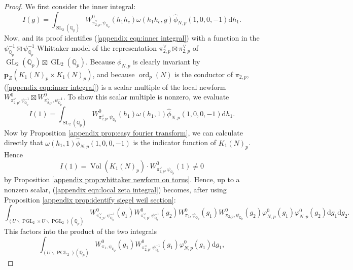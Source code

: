 \documentclass[12pt]{amsart}
\DeclareMathOperator{\ord}{ord}
\DeclareMathOperator{\SL}{SL}
\theoremstyle{definition}
\newcommand{\Q}{\mathbb{Q}}
\DeclareMathOperator{\GL}{GL}
\renewcommand{\d}{\mathrm{d}}
\begin{document}
\begin{proof}
We first consider the inner integral:
\begin{equation}\label{appendix eqn:inner integral}
   I(g) = \int_{\SL_2(\Q_p)} W_{\pi_{2,p}^\vee,\psi_{\Q_p}}^0(h_1h_c) \omega(h_1h_c,g) \widehat \phi_{N,p}(1,0,0,-1) \d h_1.
\end{equation}
Now, \cite[Lemma 6.3.3]{sweeting2022tateclassesendoscopyoperatornamegsp4} and its proof identifies (\ref{appendix eqn:inner integral}) with a function in the $\psi_{\Q_p}^{-1}\boxtimes \psi_{\Q_p}^{-1}$-Whittaker model of the representation $\pi_{2,p}^\vee\boxtimes \pi_{2,p}^\vee$ of $\GL_2(\Q_p)\boxtimes\GL_2(\Q_p)$. 
Because $\phi_{N,p}$ is clearly invariant by $\boldsymbol{p}_Z(K_1(N)_p\times K_1(N)_p)$, and because $\ord_p(N)$ is the conductor of $\pi_{2,p}$,  (\ref{appendix eqn:inner integral}) is a scalar multiple of the local newform $W_{\pi_{2,p}^\vee,\psi_{\Q_p}^{-1}}^0\boxtimes W_{\pi_{2,p}^\vee,\psi_{\Q_p}^{-1}}^0$.
To show this scalar multiple is nonzero, we evaluate 
\begin{equation}
    I(1) = \int_{\SL_2(\Q_p)} W_{\pi_{2,p}^\vee,\psi_{\Q_p}}^0(h_1) \omega(h_1, 1) \widehat \phi_{N,p} (1,0,0,-1) \d h_1.
\end{equation}
Now by Proposition \ref{appendix prop:easy fourier transform}, we can calculate directly that $\omega(h_1, 1) \widehat \phi_{N,p} (1,0,0,-1) $ is the indicator function of $K_1(N)_p$. Hence $$I(1) = \operatorname{Vol}(K_1(N)_p) \cdot W_{\pi_{2,p}^\vee,\psi_{\Q_p}}^0(1) \neq 0$$ by Proposition \ref{appendix prop:whittaker newform on torus}.
Hence, up to a nonzero scalar, (\ref{appendix eqn:local zeta integral}) becomes, after using Proposition \ref{appendix prop:identify siegel weil section}:
\begin{equation}
    \int_{(U\backslash \operatorname{PGL}_2\times U\backslash\operatorname{PGL}_2)(\Q_p)}W_{\pi_{2,p}^\vee, \psi_{\Q_p}^{-1}}^0(g_1) W_{\pi_{2,p}^\vee,\psi_{\Q_p}^{-1}}^0(g_2) W^0_{\pi_1,\psi_{\Q_p}} (g_1) W^0_{\pi_{2,p},\psi_{\Q_p}}(g_2) \varphi^0_{N,p} (g_1) \varphi^0_{N,p} (g_2) \d g_1 \d g_2.
\end{equation}
This factors into the product of the two integrals
\begin{equation}\label{appendix eqn:first factored local zeta integral}
    \int_{(U\backslash \operatorname{PGL}_2)(\Q_p)} W^0_{\pi_1,\psi_{\Q_p}} (g_1) W_{\pi_{2,p}^\vee, \psi_{\Q_p}^{-1}}^0(g_1)\varphi^0_{N,p} (g_1) \d g_1,
    \end{equation}\begin{equation}\label{appendix eqn:second factored local zeta integral}

\end{equation}
\end{proof}
\end{document}
